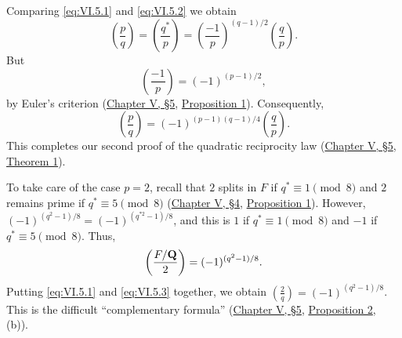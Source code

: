 Comparing \eqref{eq:VI.5.1} and \eqref{eq:VI.5.2} we obtain
\[
\left(\frac{p}{q}\right)=\left(\frac{q^{*}}{p}\right)
=\left(\frac{-1}{p}\right)^{(q-1)/2}\left(\frac{q}{p}\right).
\]
But
\[
\left(\frac{-1}{p}\right)=(-1)^{(p-1)/2},
\]
by Euler's criterion (\hyperref[sec:5.5]{Chapter V, §5}, \hyperref[prop:V.5.1]{Proposition 1}). Consequently,
\[
\left(\frac{p}{q}\right)=(-1)^{(p-1)(q-1)/4}\left(\frac{q}{p}\right).
\]
This completes our second proof of the quadratic reciprocity law
(\hyperref[sec:5.5]{Chapter V, §5}, \hyperref[thm:V.5.1]{Theorem 1}).

To take care of the case $p=2$, recall that $2$ splits in $F$ if
$q^{*}\equiv1\pmod8$ and $2$ remains prime if
$q^{*}\equiv5\pmod8$ (\hyperref[sec:5.4]{Chapter V, §4}, \hyperref[prop:V.4.1]{Proposition 1}). However,
$(-1)^{(q^{2}-1)/8}=(-1)^{(q^{*2}-1)/8}$, and this is $1$ if
$q^{*}\equiv1\pmod8$ and $-1$ if $q^{*}\equiv5\pmod8$. Thus,
\begin{equation}
\left(\frac{F/\mathbf{Q}}{2}\right)=(-1)^{(q^{2}-1)/8}.
\label{eq:VI.5.3}
\end{equation}
Putting \eqref{eq:VI.5.1} and \eqref{eq:VI.5.3} together, we obtain
$\left(\frac{2}{q}\right)=(-1)^{(q^{2}-1)/8}$. This is the difficult
``complementary formula'' (\hyperref[sec:5.5]{Chapter V, §5}, \hyperref[prop:V.5.2]{Proposition 2}, (b)).
